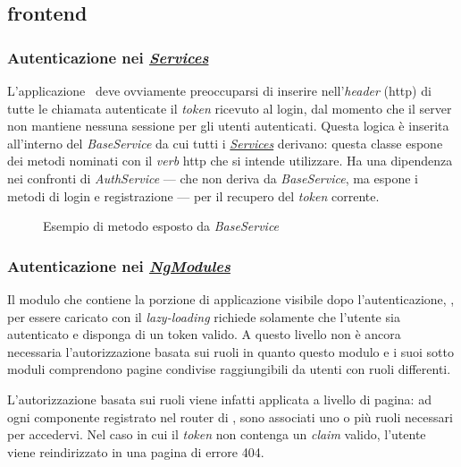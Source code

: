 \subsection{\Gls{frontend}}
\subsubsection{Autenticazione nei \textit{\hyperref[client:services]{Services}}}
L'applicazione \angular~deve ovviamente preoccuparsi di inserire nell'\textit{header} (\acrshort{http}) di tutte le chiamata autenticate il \textit{token} ricevuto al login, dal momento che il server non mantiene nessuna sessione per gli utenti autenticati. Questa logica è inserita all'interno del \textit{BaseService} da cui tutti i \textit{\hyperref[client:services]{Services}} derivano: questa classe espone dei metodi nominati con il \textit{verb} \acrshort{http} che si intende utilizzare. Ha una dipendenza nei confronti di \textit{AuthService} --- che non deriva da \textit{BaseService}, ma espone i metodi di login e registrazione --- per il recupero del \textit{token} corrente.

\begin{figure}[H] 
	\centering    
	
	\caption[Esempio di metodo esposto da \textit{BaseService}]{Esempio di metodo esposto da \textit{BaseService}}
	\label{fig:client-auth-base-service}
\end{figure}

\subsubsection{Autenticazione nei \textit{\hyperref[client:modules]{NgModules}}}

Il modulo che contiene la porzione di applicazione visibile dopo l'autenticazione, \textit{}, per essere caricato con il \textit{lazy-loading} richiede solamente che l'utente sia autenticato e disponga di un token valido. A questo livello non è ancora necessaria l'autorizzazione basata sui ruoli in quanto questo modulo e i suoi sotto moduli comprendono pagine condivise raggiungibili da utenti con ruoli differenti.

L'autorizzazione basata sui ruoli viene infatti applicata a livello di pagina: ad ogni componente registrato nel router di \angular, sono associati uno o più ruoli necessari per accedervi. Nel caso in cui il \textit{token} non contenga un \textit{claim} valido, l'utente viene reindirizzato in una pagina di errore 404.


